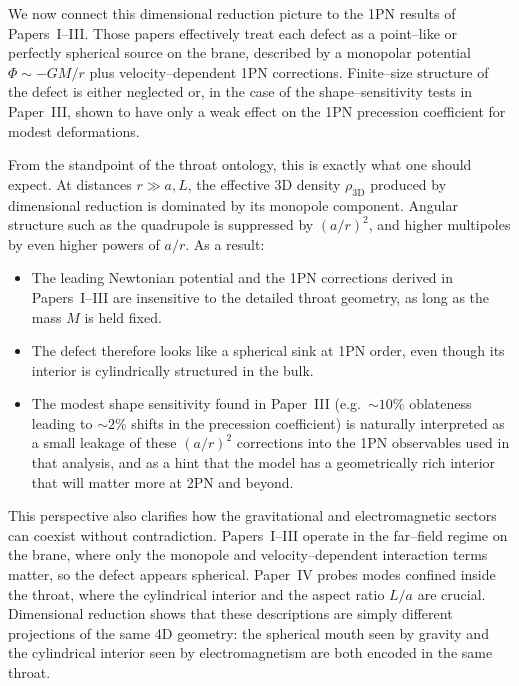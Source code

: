 \documentclass[12pt]{article}
\begin{document}
We now connect this dimensional reduction picture to the 1PN results of
Papers~I--III.  Those papers effectively treat each defect as a point--like
or perfectly spherical source on the brane, described by a monopolar
potential $\Phi \sim -GM/r$ plus velocity--dependent 1PN corrections.
Finite--size structure of the defect is either neglected or, in the case of
the shape--sensitivity tests in Paper~III, shown to have only a weak effect
on the 1PN precession coefficient for modest deformations.

From the standpoint of the throat ontology, this is exactly what one should
expect.  At distances $r\gg a,L$, the effective 3D density
$\rho_{\mathrm{3D}}$ produced by dimensional reduction is dominated by its
monopole component.  Angular structure such as the quadrupole is suppressed
by $(a/r)^2$, and higher multipoles by even higher powers of $a/r$.  As a
result:
\begin{itemize}
  \item The leading Newtonian potential and the 1PN corrections derived in
        Papers~I--III are insensitive to the detailed throat geometry, as
        long as the mass $M$ is held fixed.
  \item The defect therefore looks like a spherical sink at 1PN order, even
        though its interior is cylindrically structured in the bulk.
  \item The modest shape sensitivity found in Paper~III (e.g.\ $\sim 10\%$
        oblateness leading to $\sim 2\%$ shifts in the precession
        coefficient) is naturally interpreted as a small leakage of these
        $(a/r)^2$ corrections into the 1PN observables used in that
        analysis, and as a hint that the model has a geometrically rich
        interior that will matter more at 2PN and beyond.
\end{itemize}

This perspective also clarifies how the gravitational and electromagnetic
sectors can coexist without contradiction.  Papers~I--III operate in the
far--field regime on the brane, where only the monopole and velocity--dependent
interaction terms matter, so the defect appears spherical.  Paper~IV probes
modes confined inside the throat, where the cylindrical interior and the
aspect ratio $L/a$ are crucial.  Dimensional reduction shows that these
descriptions are simply different projections of the same 4D geometry: the
spherical mouth seen by gravity and the cylindrical interior seen by
electromagnetism are both encoded in the same throat.
\end{document}
